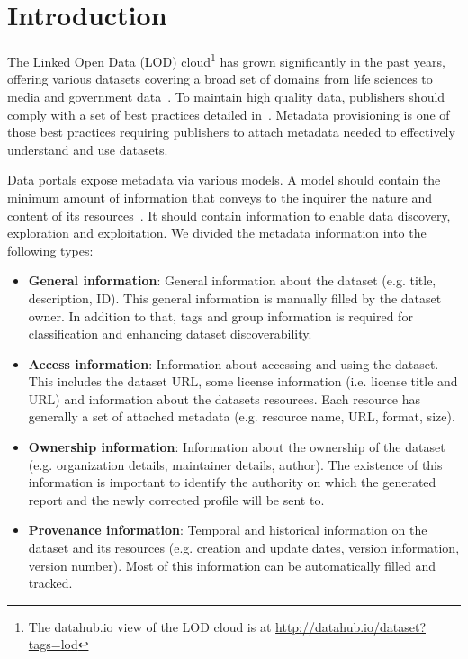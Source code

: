 \documentclass[runningheads,a4paper]{../../Tools/LaTEX/llncs}
\begin{document}
\section{Introduction}
\label{sec:introduction}
The Linked Open Data (LOD) cloud\footnote{The datahub.io view of the LOD cloud is at \url{http://datahub.io/dataset?tags=lod}} has grown significantly in the past years, offering various datasets covering a broad set of domains from life sciences to media and government data~\cite{Bizer:IJSWIS:09}. To maintain high quality data, publishers should comply with a set of best practices detailed in~\cite{Bizer:DB:11}. Metadata provisioning is one of those best practices requiring publishers to attach metadata needed to effectively understand and use datasets.

Data portals expose metadata via various models. A model should contain the minimum amount of information that conveys to the inquirer the nature and content of its resources~\cite{Nebert:GSDI:04}. It should contain information to enable data discovery, exploration and exploitation. We divided the metadata information into the following types:
\begin{itemize}
 \item \textbf{General information}: General information about the dataset (e.g. title, description, ID). This general information is manually filled by the dataset owner. In addition to that, tags and group information is required for classification and enhancing dataset discoverability.
 \item \textbf{Access information}: Information about accessing and using the dataset. This includes the dataset URL, some license information (i.e. license title and URL) and information about the datasets resources. Each resource has generally a set of attached metadata (e.g. resource name, URL, format, size).
 \item \textbf{Ownership information}: Information about the ownership of the dataset (e.g. organization details, maintainer details, author). The existence of this information is important to identify the authority on which the generated report and the newly corrected profile will be sent to.
 \item \textbf{Provenance information}: Temporal and historical information on the dataset and its resources (e.g. creation and update dates, version information, version number). Most of this information can be automatically filled and tracked.
\end{itemize}
\end{document}
